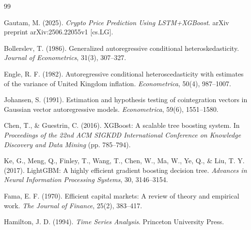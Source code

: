 \documentclass[12pt,letterpaper]{article}
\begin{document}
\begin{thebibliography}{99}

Gautam, M. (2025). 
\textit{Crypto Price Prediction Using LSTM+XGBoost}. 
arXiv preprint arXiv:2506.22055v1 [cs.LG].

Bollerslev, T. (1986). 
Generalized autoregressive conditional heteroskedasticity. 
\textit{Journal of Econometrics}, 31(3), 307--327.

Engle, R. F. (1982). 
Autoregressive conditional heteroscedasticity with estimates of the variance of United Kingdom inflation. 
\textit{Econometrica}, 50(4), 987--1007.

Johansen, S. (1991). 
Estimation and hypothesis testing of cointegration vectors in Gaussian vector autoregressive models. 
\textit{Econometrica}, 59(6), 1551--1580.

Chen, T., \& Guestrin, C. (2016). 
XGBoost: A scalable tree boosting system. 
In \textit{Proceedings of the 22nd ACM SIGKDD International Conference on Knowledge Discovery and Data Mining} (pp. 785--794).

Ke, G., Meng, Q., Finley, T., Wang, T., Chen, W., Ma, W., Ye, Q., \& Liu, T. Y. (2017). 
LightGBM: A highly efficient gradient boosting decision tree. 
\textit{Advances in Neural Information Processing Systems}, 30, 3146--3154.

Fama, E. F. (1970). 
Efficient capital markets: A review of theory and empirical work. 
\textit{The Journal of Finance}, 25(2), 383--417.

Hamilton, J. D. (1994). 
\textit{Time Series Analysis}. 
Princeton University Press.

\end{thebibliography}
\end{document}
